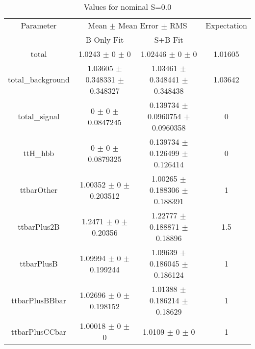 \begin{table}
\centering
\caption{Values for nominal S=0.0}
\begin{tabular}{cccc}
\toprule
Parameter & \multicolumn{2}{c}{Mean $\pm$ Mean Error $\pm$ RMS} & Expectation\\
 & B-Only Fit & S+B Fit & \\
\midrule
total & \num{1.0243} $\pm$ \num{0} $\pm$ \num{0} & \num{1.02446} $\pm$ \num{0} $\pm$ \num{0} & \num{1.01605}\\
total\_background & \num{1.03605} $\pm$ \num{0.348331} $\pm$ \num{0.348327} & \num{1.03461} $\pm$ \num{0.348441} $\pm$ \num{0.348438} & \num{1.03642}\\
total\_signal & \num{0} $\pm$ \num{0} $\pm$ \num{0.0847245} & \num{0.139734} $\pm$ \num{0.0960754} $\pm$ \num{0.0960358} & \num{0}\\
ttH\_hbb & \num{0} $\pm$ \num{0} $\pm$ \num{0.0879325} & \num{0.139734} $\pm$ \num{0.126499} $\pm$ \num{0.126414} & \num{0}\\
ttbarOther & \num{1.00352} $\pm$ \num{0} $\pm$ \num{0.203512} & \num{1.00265} $\pm$ \num{0.188306} $\pm$ \num{0.188391} & \num{1}\\
ttbarPlus2B & \num{1.2471} $\pm$ \num{0} $\pm$ \num{0.20356} & \num{1.22777} $\pm$ \num{0.188871} $\pm$ \num{0.18896} & \num{1.5}\\
ttbarPlusB & \num{1.09994} $\pm$ \num{0} $\pm$ \num{0.199244} & \num{1.09639} $\pm$ \num{0.186045} $\pm$ \num{0.186124} & \num{1}\\
ttbarPlusBBbar & \num{1.02696} $\pm$ \num{0} $\pm$ \num{0.198152} & \num{1.01388} $\pm$ \num{0.186214} $\pm$ \num{0.18629} & \num{1}\\
ttbarPlusCCbar & \num{1.00018} $\pm$ \num{0} $\pm$ \num{0} & \num{1.0109} $\pm$ \num{0} $\pm$ \num{0} & \num{1}\\
\bottomrule
\end{tabular}
\end{table}